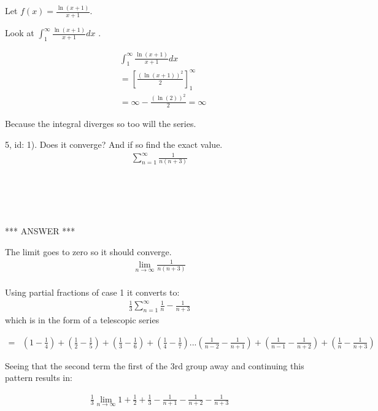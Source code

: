 \documentclass[fleqn]{article}
\begin{document}
Let $f(x) = \frac{\ln(x+1)}{x+1}$.

Look at $\int_{1}^{\infty} \frac{\ln(x+1)}{x+1} dx$ .

\begin{align*}
& \int_{1}^{\infty} \frac{\ln(x+1)}{x+1} dx\\
&= \left[ \frac{(\ln(x+1))^2}{2} \right]_{1}^{\infty}\\
&= \infty - \frac{(\ln(2))^2}{2} = \infty
\end{align*}

Because the integral diverges so too will the series.

5, id: 1).  Does it converge?  And if so find the exact value.\\

\begin{align*}
\sum_{n=1}^{\infty}\frac{1}{n(n+3)}
\end{align*}


\begin{verbatim}





\end{verbatim}

*** ANSWER ***


The limit goes to zero so it should converge.
\begin{align*}
\lim_{n\rightarrow\infty}\frac{1}{n (n+3)}\\
\end{align*}

Using partial fractions of case 1 it converts to:
\begin{align*}
\frac{1}{3} \sum_{n=1}^{\infty}\frac{1}{n} - \frac{1}{n+3}
\end{align*}
which is in the form of a telescopic series

\begin{align*}
= & \left(1-\frac{1}{4}\right)+\left(\frac{1}{2}-\frac{1}{5}\right)+\left(\frac{1}{3}-\frac{1}{6}\right)+\left(\frac{1}{4}-\frac{1}{7}\right)...\left(\frac{1}{n-2}-\frac{1}{n+1}\right)+\left(\frac{1}{n-1}-\frac{1}{n+2}\right)+\left(\frac{1}{n}-\frac{1}{n+3}\right)\end{align*}

Seeing that the second term the first of the 3rd group away and continuing
this pattern results in:

\begin{align*}
\frac{1}{3}\lim_{n\rightarrow\infty}1+\frac{1}{2}+\frac{1}{3}-\frac{1}{n+1}-\frac{1}{n+2}-\frac{1}{n+3}
\end{align*}
\end{document}
